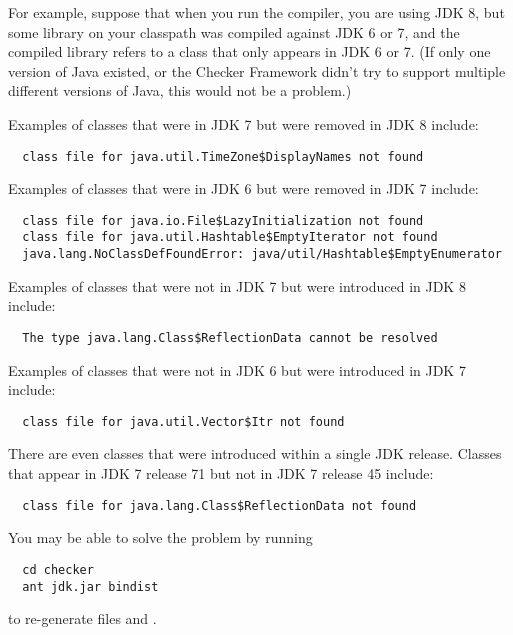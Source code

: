 \begin{itemize}
For example, suppose that when you run the compiler, you are using JDK 8,
but some library on your classpath was compiled against JDK 6 or 7, and the
compiled library refers to a class that only appears in JDK 6 or 7.  (If only
one version of Java existed, or the Checker Framework didn't try to support
multiple different versions of Java, this would not be a problem.)

Examples of classes that were in JDK 7 but were removed in JDK 8 include:

\begin{Verbatim}
  class file for java.util.TimeZone$DisplayNames not found
\end{Verbatim}

Examples of classes that were in JDK 6 but were removed in JDK 7 include:

\begin{Verbatim}
  class file for java.io.File$LazyInitialization not found
  class file for java.util.Hashtable$EmptyIterator not found
  java.lang.NoClassDefFoundError: java/util/Hashtable$EmptyEnumerator
\end{Verbatim}

Examples of classes that were not in JDK 7 but were introduced in JDK 8 include:

\begin{Verbatim}
  The type java.lang.Class$ReflectionData cannot be resolved
\end{Verbatim}

Examples of classes that were not in JDK 6 but were introduced in JDK 7 include:

\begin{Verbatim}
  class file for java.util.Vector$Itr not found
\end{Verbatim}

There are even classes that were introduced within a single JDK release.
Classes that appear in JDK 7 release 71 but not in JDK 7 release 45 include:

\begin{Verbatim}
  class file for java.lang.Class$ReflectionData not found
\end{Verbatim}

You may be able to solve the problem by running

\begin{Verbatim}
  cd checker
  ant jdk.jar bindist
\end{Verbatim}

\noindent
to re-generate files  and .


\end{itemize}
